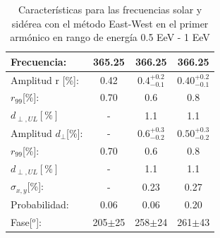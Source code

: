 \documentclass[11pt,papel,oneside,singlespace]{ibtesis}
\begin{document}
\begin{table}[H]
        \begin{small}
            \begin{center}
                \begin{tabular}[c]{l|c||c|c}
                    Frecuencia:             & 365.25	    & 366.25		& 366.25\cite{Aab_2020}\\
                    \hline
                    Amplitud r [\%]:        & 0.42          & $0.4^{+0.2}_{-0.1}$ 	        & $0.40^{+0.2}_{-0.1}$\cite{codigo}  \\
                    $r_{99}$[\%]:           & 0.70	        & 0.6          & 0.8\cite{codigo}  \\
                    $d_{\perp,UL}[\%]$      & -             & 1.1          & 1.1\\                    
                    \hline
                    Amplitud $d_\perp$[\%]: & -             & $0.6^{+0.3}_{-0.2}$           & $0.50^{+0.3}_{-0.2}$\\
                    $r_{99}$[\%]:           & 0.70	        & 0.6          & 0.8\cite{codigo}  \\
                    $d_{\perp,UL}[\%]$      & -             & 1.1          & 1.1\\

                    $\sigma_{x,y}$[\%]:     & -	            & 0.23	        & 0.27       \\
                    Probabilidad:           & 0.06          & 0.06	        & 0.20\\
                    Fase[$^o$]:             & 205$\pm$25	& 258$\pm$24	& 261$\pm$43\cite{discrepancia}   \\
                \end{tabular}
            \end{center}
        \end{small}
        \caption{Características para las frecuencias solar y sidérea con el método East-West en el primer armónico en rango de energía 0.5 EeV - 1 EeV}
        \label{tab:solar}
    \end{table}
\end{document}
